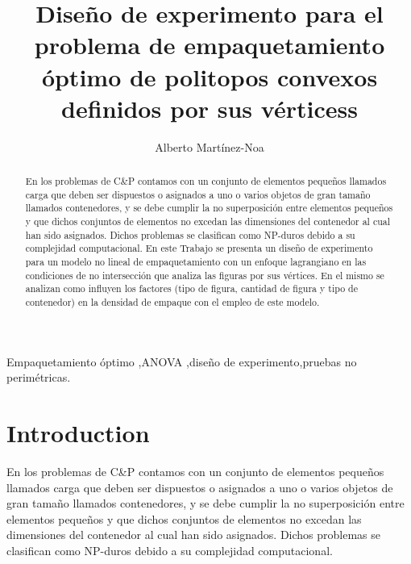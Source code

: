\documentclass[5p,times]{elsarticle}
\begin{document}
\begin{frontmatter}

\title{Diseño de experimento para el problema de empaquetamiento óptimo de politopos convexos definidos por sus vérticess}


\author{Alberto Martínez-Noa}
\address{Facultad de Ingeniería Mecánica y Eléctrica,
Universidad Autónoma de Nuevo León}

\begin{abstract}
En los problemas de C\&P contamos con un conjunto de elementos pequeños llamados carga que deben ser dispuestos o asignados a uno o varios objetos de gran tamaño llamados contenedores, y se debe cumplir la no superposición entre elementos pequeños y que dichos conjuntos de elementos no excedan las dimensiones del contenedor al cual han sido asignados. Dichos problemas se clasifican como NP-duros \cite{FOWLER1981133} debido a su complejidad computacional. 
En este Trabajo se presenta un diseño de experimento para un modelo no lineal de empaquetamiento con un enfoque lagrangiano en las condiciones de no intersección que analiza las figuras por sus vértices. En el mismo se analizan como influyen los factores (tipo de figura, cantidad de figura y tipo de contenedor) en la densidad de empaque con el empleo de este modelo.
 
\end{abstract}

\begin{keyword}
	Empaquetamiento óptimo \sep ANOVA \sep diseño de experimento\sep pruebas no perimétricas. 
	
	
	
\end{keyword}

\end{frontmatter}

\section{Introduction}

   En los problemas de C\&P contamos con un conjunto de elementos pequeños llamados carga que deben ser dispuestos o asignados a uno o varios objetos de gran tamaño llamados contenedores, y se debe cumplir la no superposición entre elementos pequeños y que dichos conjuntos de elementos no excedan las dimensiones del contenedor al cual han sido asignados. Dichos problemas se clasifican como NP-duros \cite{FOWLER1981133} debido a su complejidad computacional.
\end{document}
